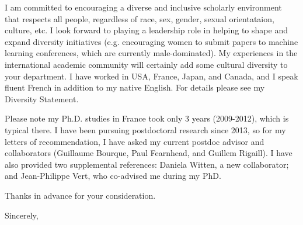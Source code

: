 \documentclass{article}
\begin{document}

I am committed to encouraging a diverse and inclusive scholarly
environment that respects all people, regardless of race, sex, gender,
sexual orientataion, culture, etc. I look forward to playing a
leadership role in helping to shape and expand diversity initiatives
(e.g. encouraging women to submit papers to machine learning
conferences, which are currently male-dominated). My experiences in
the international academic community will certainly add some cultural
diversity to your department. I have worked in USA, France, Japan, and
Canada, and I speak fluent French in addition to my native English.
For details please see my Diversity Statement.


Please note my Ph.D. studies in France took only 3
years (2009-2012), which is typical there.
I have been pursuing postdoctoral research since 2013, so for my
letters of recommendation, I have asked my current postdoc advisor and
collaborators (Guillaume Bourque, Paul Fearnhead, and Guillem
Rigaill). I have also provided two supplemental references: Daniela
Witten, a new collaborator; and Jean-Philippe Vert, who co-advised me during
my PhD.

Thanks in advance for your consideration.

Sincerely,
\end{document}
